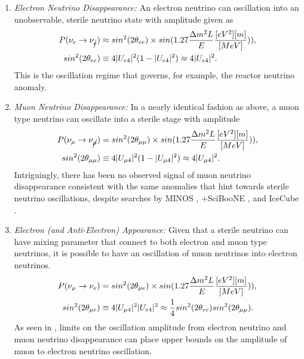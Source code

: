 \begin{enumerate}
  \item{ \em Electron Neutrino Disappearance:} An electron neutrino can oscillation into an unobservable, sterile neutrino state with amplitude given as
  \begin{align}
  P(\nu_{e} \rightarrow \nu_{\cancel{e}}) &\approx sin^2(2 \theta_{ee})\times sin(1.27 \frac{\Delta m^2 L}{E} \frac{[eV^2][m]}{[MeV]})),
   \\
  sin^2(2 \theta_{ee}) &\equiv 4 |U_{e4}|^2 (1 - |U_{e4}|^2) \approx 4 |U_{e4}|^2.
  \end{align}
  This is the oscillation regime that governs, for example, the reactor neutrino anomaly.
  \item { \em Muon Neutrino Disappearance: } In a nearly identical fashion as above, a muon type neutrino can oscillate into a sterile stage with amplitude 
  \begin{align}
  P(\nu_{\mu} \rightarrow \nu_{\cancel{\mu}}) &= sin^2(2 \theta_{\mu\mu})\times sin(1.27 \frac{\Delta m^2 L}{E} \frac{[eV^2][m]}{[MeV]})),
   \\
  sin^2(2 \theta_{\mu\mu}) &\equiv 4 |U_{\mu4}|^2 (1 - |U_{\mu4}|^2) \approx 4 |U_{\mu 4}|^2.
  \end{align}
  Intriguingly, there has been no observed signal of muon neutrino disappearance consistent with the same anomalies that hint towards sterile neutrino oscillations, despite searches by MINOS \cite{Adamson:2010wi}, \MB+SciBooNE \cite{Mahn:2011ea}, and IceCube \cite{TheIceCube:2016oqi}.

  \item { \em Electron (and Anti-Electron) Appearance:} Given that a sterile neutrino can have mixing parameter that connect to both electron and muon type neutrinos, it is possible to have an oscillation of muon neutrinos into electron neutrinos.
  \begin{align}
  P(\nu_{\mu} \rightarrow \nu_{e}) &= sin^2(2 \theta_{\mu e})\times sin(1.27 \frac{\Delta m^2 L}{E} \frac{[eV^2][m]}{[MeV]})),
   \\
  sin^2(2 \theta_{\mu e}) &\equiv 4 |U_{\mu4}|^2|U_{e4}|^2 \approx \frac{1}{4} sin^2(2 \theta_{ee}) sin^2(2 \theta_{\mu \mu}).
  \end{align}
  As seen in \cite{giunti_constraint,other_constraint}, limits on the oscillation amplitude from electron neutrino and muon neutrino disappearance can place upper bounds on the amplitude of muon to electron neutrino oscillation.
\end{enumerate}

